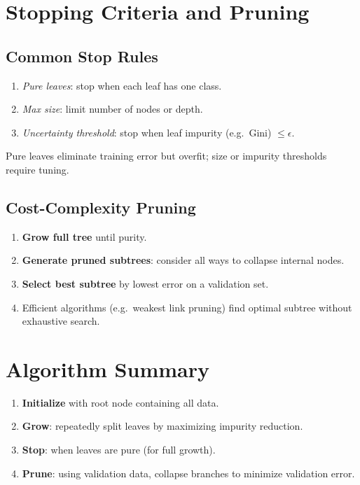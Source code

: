 \documentclass[11pt]{article}
\begin{document}
\section{Stopping Criteria and Pruning}
\subsection{Common Stop Rules}
\begin{enumerate}
  \item \emph{Pure leaves}: stop when each leaf has one class.
  \item \emph{Max size}: limit number of nodes or depth.
  \item \emph{Uncertainty threshold}: stop when leaf impurity (e.g.\ Gini) $\le\epsilon$.
\end{enumerate}
Pure leaves eliminate training error but overfit; size or impurity thresholds require tuning.

\subsection{Cost-Complexity Pruning}
\begin{enumerate}
  \item \textbf{Grow full tree} until purity.
  \item \textbf{Generate pruned subtrees}: consider all ways to collapse internal nodes.
  \item \textbf{Select best subtree} by lowest error on a validation set.
  \item Efficient algorithms (e.g.\ weakest link pruning) find optimal subtree without exhaustive search.
\end{enumerate}

\section{Algorithm Summary}
\begin{enumerate}
  \item \textbf{Initialize} with root node containing all data.
  \item \textbf{Grow}: repeatedly split leaves by maximizing impurity reduction.
  \item \textbf{Stop}: when leaves are pure (for full growth).
  \item \textbf{Prune}: using validation data, collapse branches to minimize validation error.
\end{enumerate}
\end{document}
